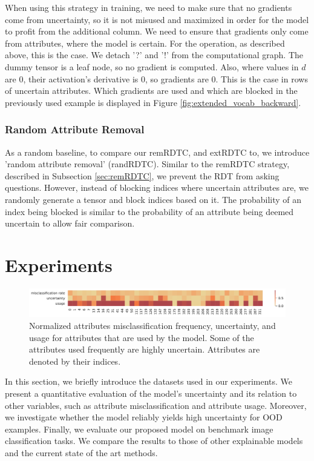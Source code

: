 \documentclass[a4paper,cleardoubleempty,BCOR1cm, 11pt]{report}
\begin{document}
When using this strategy in training, we need to make sure that no gradients come from uncertainty, so it is not misused and maximized in order for the model to profit from the additional column. We need to ensure that gradients only come from attributes, where the model is certain. For the operation, as described above, this is the case. We detach '?' and '!' from the computational graph. The dummy tensor is a leaf node, so no gradient is computed. Also, where values  in $d$ are $0$, their activation's derivative is $0$, so gradients are $0$. This is the case in rows of uncertain attributes. Which gradients are used and which are blocked in the previously used example is displayed in Figure \ref{fig:extended_vocab_backward}.




\subsection{Random Attribute Removal}
As a random baseline, to compare our remRDTC, and extRDTC to, we introduce 'random attribute removal' (randRDTC).
Similar to the remRDTC strategy, described in Subsection \ref{sec:remRDTC}, we prevent the RDT from asking questions. However, instead of blocking indices where uncertain attributes are, we randomly generate a tensor and block indices based on it. The probability of an index being blocked is similar to the probability of an attribute being deemed uncertain to allow fair comparison.




\chapter{Experiments}
\begin{figure}[t!]
	\centering
	\includegraphics[width=1\textwidth]{images/attr_heatmap_short.pdf} 
	\caption{Normalized attributes misclassification frequency, uncertainty, and usage for attributes that are used by the model. Some of the attributes used frequently are highly uncertain. Attributes are denoted by their indices.}
	\label{fig:less_attrs}
\end{figure}
In this section, we briefly introduce the datasets used in our experiments. We present a quantitative evaluation of the model's uncertainty and its relation to other variables, such as attribute misclassification and attribute usage. Moreover, we investigate whether the model reliably yields high uncertainty for OOD examples. Finally, we evaluate our proposed model on benchmark image classification tasks. We compare the results to those of other explainable models and the current state of the art methods.
\end{document}
